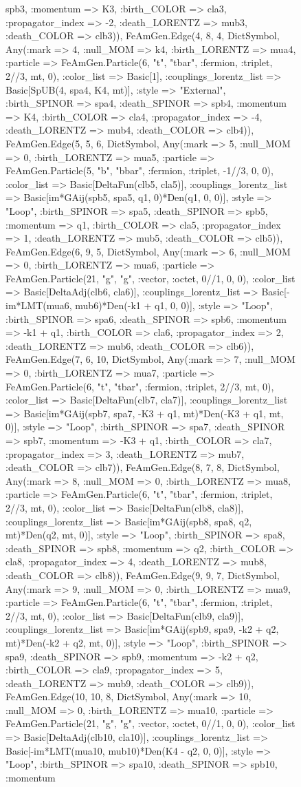 \documentclass{revtex4}
\begin{document}
\begin{figure}[!htb]
\begin{center}
{spb3, :momentum => K3, :birth_COLOR => cla3, :propagator_index => -2, :death_LORENTZ => mub3, :death_COLOR => clb3)), FeAmGen.Edge(4, 8, 4, Dict{Symbol, Any}(:mark => 4, :null_MOM => k4, :birth_LORENTZ => mua4, :particle => FeAmGen.Particle(6, "t", "tbar", :fermion, :triplet, 2//3, mt, 0), :color_list => Basic[1], :couplings_lorentz_list => Basic[SpUB(4, spa4, K4, mt)], :style => "External", :birth_SPINOR => spa4, :death_SPINOR => spb4, :momentum => K4, :birth_COLOR => cla4, :propagator_index => -4, :death_LORENTZ => mub4, :death_COLOR => clb4)), FeAmGen.Edge(5, 5, 6, Dict{Symbol, Any}(:mark => 5, :null_MOM => 0, :birth_LORENTZ => mua5, :particle => FeAmGen.Particle(5, "b", "bbar", :fermion, :triplet, -1//3, 0, 0), :color_list => Basic[DeltaFun(clb5, cla5)], :couplings_lorentz_list => Basic[im*GAij(spb5, spa5, q1, 0)*Den(q1, 0, 0)], :style => "Loop", :birth_SPINOR => spa5, :death_SPINOR => spb5, :momentum => q1, :birth_COLOR => cla5, :propagator_index => 1, :death_LORENTZ => mub5, :death_COLOR => clb5)), FeAmGen.Edge(6, 9, 5, Dict{Symbol, Any}(:mark => 6, :null_MOM => 0, :birth_LORENTZ => mua6, :particle => FeAmGen.Particle(21, "g", "g", :vector, :octet, 0//1, 0, 0), :color_list => Basic[DeltaAdj(clb6, cla6)], :couplings_lorentz_list => Basic[-im*LMT(mua6, mub6)*Den(-k1 + q1, 0, 0)], :style => "Loop", :birth_SPINOR => spa6, :death_SPINOR => spb6, :momentum => -k1 + q1, :birth_COLOR => cla6, :propagator_index => 2, :death_LORENTZ => mub6, :death_COLOR => clb6)), FeAmGen.Edge(7, 6, 10, Dict{Symbol, Any}(:mark => 7, :null_MOM => 0, :birth_LORENTZ => mua7, :particle => FeAmGen.Particle(6, "t", "tbar", :fermion, :triplet, 2//3, mt, 0), :color_list => Basic[DeltaFun(clb7, cla7)], :couplings_lorentz_list => Basic[im*GAij(spb7, spa7, -K3 + q1, mt)*Den(-K3 + q1, mt, 0)], :style => "Loop", :birth_SPINOR => spa7, :death_SPINOR => spb7, :momentum => -K3 + q1, :birth_COLOR => cla7, :propagator_index => 3, :death_LORENTZ => mub7, :death_COLOR => clb7)), FeAmGen.Edge(8, 7, 8, Dict{Symbol, Any}(:mark => 8, :null_MOM => 0, :birth_LORENTZ => mua8, :particle => FeAmGen.Particle(6, "t", "tbar", :fermion, :triplet, 2//3, mt, 0), :color_list => Basic[DeltaFun(clb8, cla8)], :couplings_lorentz_list => Basic[im*GAij(spb8, spa8, q2, mt)*Den(q2, mt, 0)], :style => "Loop", :birth_SPINOR => spa8, :death_SPINOR => spb8, :momentum => q2, :birth_COLOR => cla8, :propagator_index => 4, :death_LORENTZ => mub8, :death_COLOR => clb8)), FeAmGen.Edge(9, 9, 7, Dict{Symbol, Any}(:mark => 9, :null_MOM => 0, :birth_LORENTZ => mua9, :particle => FeAmGen.Particle(6, "t", "tbar", :fermion, :triplet, 2//3, mt, 0), :color_list => Basic[DeltaFun(clb9, cla9)], :couplings_lorentz_list => Basic[im*GAij(spb9, spa9, -k2 + q2, mt)*Den(-k2 + q2, mt, 0)], :style => "Loop", :birth_SPINOR => spa9, :death_SPINOR => spb9, :momentum => -k2 + q2, :birth_COLOR => cla9, :propagator_index => 5, :death_LORENTZ => mub9, :death_COLOR => clb9)), FeAmGen.Edge(10, 10, 8, Dict{Symbol, Any}(:mark => 10, :null_MOM => 0, :birth_LORENTZ => mua10, :particle => FeAmGen.Particle(21, "g", "g", :vector, :octet, 0//1, 0, 0), :color_list => Basic[DeltaAdj(clb10, cla10)], :couplings_lorentz_list => Basic[-im*LMT(mua10, mub10)*Den(K4 - q2, 0, 0)], :style => "Loop", :birth_SPINOR => spa10, :death_SPINOR => spb10, :momentum }
\end{center}
\end{figure}
\end{document}

